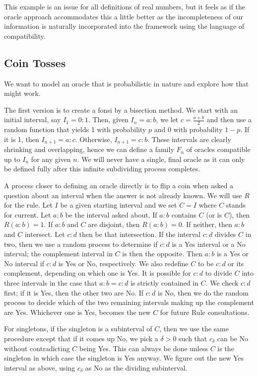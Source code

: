 \documentclass[12pt]{article}
\begin{document}
This example is an issue for all definitions of real numbers, but it feels as if the oracle approach accommodates this a little better as the incompleteness of our information is naturally incorporated into the framework using the language of compatibility.

\subsection{Coin Tosses}

We want to model an oracle that is probabilistic in nature and explore how that might work. 

The first version is to create a fonsi by a bisection method. We start with an initial interval, say $I_1 = 0:1$. Then, given $I_n = a:b$, we let $c = \tfrac{a+b}{2}$ and then use a random function that yields 1 with probability $p$ and 0 with probability $1-p$. If it is 1, then $I_{n+1} = a:c$. Otherwise, $I_{n+1} = c:b$. These intervals are clearly shrinking and overlapping, hence we can define a family $F_n$ of oracles compatible up to $I_n$ for any given $n$. We will never have a single, final oracle as it can only be defined fully after this infinite subdividing process completes. 

A process closer to defining an oracle directly is to flip a coin when asked a question about an interval when the answer is not already known. We will use $R$ for the rule. Let $I$ be a given starting interval and we set $C=I$ where $C$ stands for current. Let $a:b$ be the interval asked about. If $a:b$ contains $C$ (or is $C$), then $R(a:b) = 1$. If $a:b$ and $C$ are disjoint, then $R(a:b) = 0$. If neither, then $a:b$ and $C$ intersect. Let $c:d$ then be that intersection. If the interval $c:d$ divides $C$ in two, then we use a random process to determine if $c:d$ is a Yes interval or a No interval; the complement interval in $C$ is then the opposite. Then $a:b$ is a Yes or No interval if $c:d$ is Yes or No, respectively. We also redefine $C$ to be $c:d$ or its complement, depending on which one is Yes. It is possible for $c:d$ to divide $C$ into three intervals in the case that $a:b=c:d$ is strictly contained in $C$. We check $c:d$ first; if it is Yes, then the other two are No. If $c:d$ is No, then we do the random process to decide which of the two remaining intervals making up the complement are Yes. Whichever one is Yes, becomes the new $C$ for future Rule consultations.   

For singletons, if the singleton is a subinterval of $C$, then we use the same procedure except that if it comes up No, we pick a $\delta > 0$ such that $c_\delta$ can be No without contradicting $C$ being Yes. This can always be done unless $C$ is the singleton in which case the singleton is Yes anyway. We figure out the new Yes interval as above, using $c_\delta$ as No as the dividing subinterval. 
\end{document}
